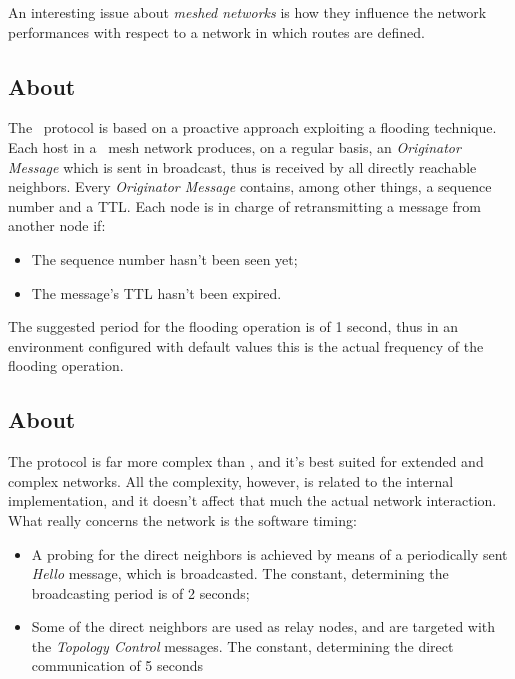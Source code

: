 An interesting issue about \emph{meshed networks} is how they
influence the network performances with respect to a network in which
routes are defined.

\subsection{About \batman}

    The \batman\ protocol is based on a proactive approach exploiting a
    flooding technique. Each host in a \batman\ mesh network produces, on a
    regular basis, an \emph{Originator Message} which is sent in
    broadcast, thus is received by all directly reachable neighbors. Every
    \emph{Originator Message} contains, among other things, a sequence
    number and a TTL. Each node is in charge of retransmitting a message
    from another node if:
    \begin{itemize}
    \item   The sequence number hasn't been seen yet;
    \item   The message's TTL hasn't been expired.
    \end{itemize}

    The suggested period for the flooding operation is of 1 second, thus
    in an environment configured with default values this is the actual
    frequency of the flooding operation.



\subsection{About \olsr}

    The protocol is far more complex than \batman, and it's best suited
    for extended and complex networks. All the complexity, however, is
    related to the internal implementation, and it doesn't affect that
    much the actual network interaction. What really concerns the network
    is the software timing:
    \begin{itemize}
    \item   A probing for the direct neighbors is achieved by means of a
            periodically sent \emph{Hello} message, which is broadcasted.
            The  constant, determining the
            broadcasting period is of 2 seconds;
    \item   Some of the direct neighbors are used as relay nodes, and are
            targeted with the \emph{Topology Control} messages.
            The  constant, determining the direct
            communication of 5 seconds
    \end{itemize}

